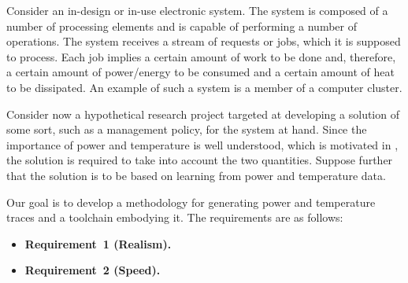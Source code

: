 Consider an in-design or in-use electronic system. The system is composed of a
number of processing elements and is capable of performing a number of
operations. The system receives a stream of requests or jobs, which it is
supposed to process. Each job implies a certain amount of work to be done and,
therefore, a certain amount of power/energy to be consumed and a certain amount
of heat to be dissipated. An example of such a system is a member of a computer
cluster.

Consider now a hypothetical research project targeted at developing a solution
of some sort, such as a management policy, for the system at hand. Since the
importance of power and temperature is well understood, which is motivated in
, the solution is required to take into account the two
quantities. Suppose further that the solution is to be based on learning from
power and temperature data.

Our goal is to develop a methodology for generating power and temperature traces
and a toolchain embodying it. The requirements are as follows:

\begin{itemize}
  \item {\bfseries Requirement~1 (Realism).}

  \item {\bfseries Requirement~2 (Speed).}
\end{itemize}

